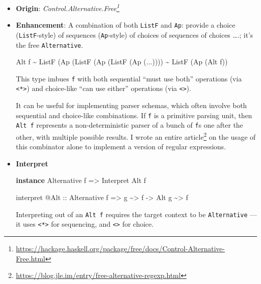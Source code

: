 \documentclass[]{article}
\newenvironment{Shaded}{}{}
\newcommand{\DataTypeTok}[1]{\textcolor[rgb]{0.56,0.13,0.00}{#1}}
\newcommand{\KeywordTok}[1]{\textcolor[rgb]{0.00,0.44,0.13}{\textbf{#1}}}
\newcommand{\NormalTok}[1]{#1}
\newcommand{\OperatorTok}[1]{\textcolor[rgb]{0.40,0.40,0.40}{#1}}
\newcommand{\OtherTok}[1]{\textcolor[rgb]{0.00,0.44,0.13}{#1}}
\renewcommand{\href}[2]{#2\footnote{\url{#1}}}
\begin{document}
\begin{itemize}
\item
  \textbf{Origin}:
  \emph{\href{https://hackage.haskell.org/package/free/docs/Control-Alternative-Free.html}{Control.Alternative.Free}}
\item
  \textbf{Enhancement}: A combination of both \texttt{ListF} and \texttt{Ap}:
  provide a choice (\texttt{ListF}-style) of sequences (\texttt{Ap}-style) of
  choices of sequences of choices \ldots.; it's the free \texttt{Alternative}.

\begin{Shaded}
\begin{Highlighting}[]
\DataTypeTok{Alt}\NormalTok{ f }\OperatorTok{\textasciitilde{}} \DataTypeTok{ListF}\NormalTok{ (}\DataTypeTok{Ap}\NormalTok{ (}\DataTypeTok{ListF}\NormalTok{ (}\DataTypeTok{Ap}\NormalTok{ (}\DataTypeTok{ListF}\NormalTok{ (}\DataTypeTok{Ap}\NormalTok{ (}\OperatorTok{...}\NormalTok{))))}
      \OperatorTok{\textasciitilde{}} \DataTypeTok{ListF}\NormalTok{ (}\DataTypeTok{Ap}\NormalTok{ (}\DataTypeTok{Alt}\NormalTok{ f))}
\end{Highlighting}
\end{Shaded}

  This type imbues \texttt{f} with both sequential ``must use both'' operations
  (via \texttt{\textless{}*\textgreater{}}) and choice-like ``can use either''
  operations (via \texttt{\textless{}\textbar{}\textgreater{}}).

  It can be useful for implementing parser schemas, which often involve both
  sequential and choice-like combinations. If \texttt{f} is a primitive parsing
  unit, then \texttt{Alt\ f} represents a non-deterministic parser of a bunch of
  \texttt{f}s one after the other, with multiple possible results. I wrote
  \href{https://blog.jle.im/entry/free-alternative-regexp.html}{an entire
  article} on the usage of this combinator alone to implement a version of
  regular expressions.
\item
  \textbf{Interpret}

\begin{Shaded}
\begin{Highlighting}[]
\KeywordTok{instance} \DataTypeTok{Alternative}\NormalTok{ f }\OtherTok{=\textgreater{}} \DataTypeTok{Interpret} \DataTypeTok{Alt}\NormalTok{ f}

\NormalTok{interpret }\OperatorTok{@}\DataTypeTok{Alt}
\OtherTok{    ::} \DataTypeTok{Alternative}\NormalTok{ f}
    \OtherTok{=\textgreater{}}\NormalTok{ g }\OperatorTok{\textasciitilde{}\textgreater{}}\NormalTok{ f}
    \OtherTok{{-}\textgreater{}} \DataTypeTok{Alt}\NormalTok{ g }\OperatorTok{\textasciitilde{}\textgreater{}}\NormalTok{ f}
\end{Highlighting}
\end{Shaded}

  Interpreting out of an \texttt{Alt\ f} requires the target context to be
  \texttt{Alternative} --- it uses \texttt{\textless{}*\textgreater{}} for
  sequencing, and \texttt{\textless{}\textbar{}\textgreater{}} for choice.
\end{itemize}
\end{document}
